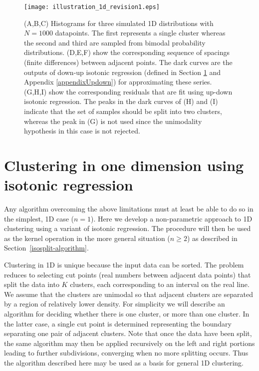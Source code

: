 \documentclass[10pt]{article}
\begin{document}
\begin{figure}
\begin{center}
\texttt{[image: illustration\_1d\_revision1.eps]}
\end{center}
\caption{
(A,B,C) Histograms for three simulated 1D distributions with $N=1000$ datapoints. The first represents a single cluster whereas the second and third are sampled from bimodal probability distributions. (D,E,F) show the corresponding sequence of spacings (finite differences) between adjacent points. The dark curves are the outputs of down-up isotonic regression (defined in Section \ref{clustering_1d} and Appendix \ref{appendixUpdown}) for approximating these series. (G,H,I) show the corresponding residuals that are fit using up-down isotonic regression. The peaks in the dark curves of (H) and (I) indicate that the set of samples should be split into two clusters, whereas the peak in (G) is not used since the unimodality hypothesis in this case is not rejected.
}
\label{fig:plots_1d}
\end{figure}

\section {Clustering in one dimension using isotonic regression}
\label{clustering_1d}

Any algorithm overcoming the above limitations must at least be able to do so in the simplest, 1D case ($n=1$). Here we develop a non-parametric approach to 1D clustering using a variant of isotonic regression. The procedure will then be used as the kernel operation in the more general situation ($n\geq2$) as described in Section~\ref{isosplit-algorithm}.

Clustering in 1D is unique because the input data can be sorted. The problem reduces to selecting cut points (real numbers between adjacent data points) that split the data into $K$ clusters, each corresponding to an interval on the real line. We assume that the clusters are unimodal so that adjacent clusters are separated by a region of relatively lower density. For simplicity we will describe an algorithm for deciding whether there is one cluster, or more than one cluster. In the latter case, a single cut point is determined representing the boundary separating one pair of adjacent clusters. Note that once the data have been split, the same algorithm may then be applied recursively on the left and right portions leading to further subdivisions, converging when no more splitting occurs. Thus the algorithm described here may be used as a basis for general 1D clustering.
\end{document}
